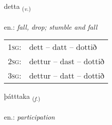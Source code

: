 \documentclass[frontgrid, backgrid]{flacards}\usepackage[]{graphicx}\usepackage[]{xcolor}
\begin{document}
\renewcommand{\flhead}{\vskip5pt \fboxsep=0pt {\small\bfseries\footnotesize Sagnorð | Verb}}
\renewcommand{\fcfoot}{\vskip5pt \fboxsep=0pt \hspace{2pt}{\small\bfseries\footnotesize 1K}}

\renewcommand{\blhead}{\vskip5pt {\small\bfseries\footnotesize Sagnorð | Verb }}
\renewcommand{\bcfoot}{\vskip5pt \hspace{2pt}{\small\bfseries\footnotesize 1K}}


{detta \small{\textsubscript{(\textit{v.})}} \\[1ex] %
\textphonetic{[tɛhta]} \\
en.: \emph{fall, drop; stumble and fall} \\  [2ex]
\renewcommand*{\arraystretch}{0.8}
\begin{tabular}{p{1cm}l}
\textsc{1sg}: & dett -- datt -- dottið \\ 
\textsc{2sg}: & dettur -- dast -- dottið \\ 
\textsc{3sg}: & dettur -- datt -- dottið \\ 
\end{tabular}
}

\renewcommand{\flhead}{\vskip5pt \fboxsep=0pt {\small\bfseries\footnotesize Nafnorð | Noun}}
\renewcommand{\fcfoot}{\vskip5pt \fboxsep=0pt \hspace{2pt}{\small\bfseries\footnotesize 1K}}

\renewcommand{\blhead}{\vskip5pt {\small\bfseries\footnotesize Nafnorð | Noun }}
\renewcommand{\bcfoot}{\vskip5pt \hspace{2pt}{\small\bfseries\footnotesize 1K}}


{þátttaka \small{\textsubscript{(\textit{f.})}} \\[1ex] %
\textphonetic{[θauhtʰaka]} \\
en.: \emph{participation} \\  [2ex]
\renewcommand*{\arraystretch}{0.8}
}
\end{document}
